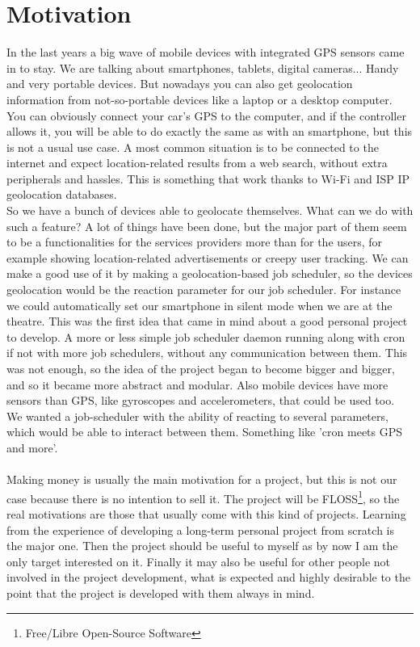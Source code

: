 \section{Motivation}
\label{moti}
In the last years a big wave of mobile devices with integrated GPS sensors came in to stay. We are talking about smartphones, tablets,
digital cameras... Handy and very portable devices. But nowadays you can also get geolocation information from not-so-portable devices
like a laptop or a desktop computer. You can obviously connect your car's GPS to the computer, and if the controller allows it, you will 
be able to do exactly the same as with an smartphone, but this is not a usual use case. A most common situation is to be connected to the
internet and expect location-related results from a web search, without extra peripherals and hassles. This is something that work
thanks to Wi-Fi and ISP IP geolocation databases.\\
So we have a bunch of devices able to geolocate themselves. What can we do with such a feature? A lot of things have been done, but the
major part of them seem to be a functionalities for the services providers more than for the users, for example showing location-related
advertisements or creepy user tracking. We can make a good use of it by making a geolocation-based job scheduler, so the devices 
geolocation would be the reaction parameter for our job scheduler. For instance we could automatically set our smartphone in silent mode 
when we are at the theatre. This was the first idea that came in mind about a good personal project to develop. A more or less simple 
job scheduler daemon running along with cron if not with more job schedulers, without any communication between them. This was not 
enough, so the idea of the project began to become bigger and bigger, and so it became more abstract and modular. Also mobile devices have
more sensors than GPS, like gyroscopes and accelerometers, that could be used too. We wanted a job-scheduler with the ability of reacting 
to several parameters, which would be able to interact between them. Something like 'cron meets GPS and more'.\\
\\
Making money is usually the main motivation for a project, but this is not our case because there is no intention to sell it. The project 
will be FLOSS\footnote{Free/Libre Open-Source Software}, so the real motivations are those that usually come with this kind of projects. 
Learning from the experience of developing a long-term personal project from scratch is the major one. Then the project should be useful 
to myself as by now I am the only target interested on it. Finally it may also be useful for other people not involved in the project 
development, what is expected and highly desirable to the point that the project is developed with them always in mind.
